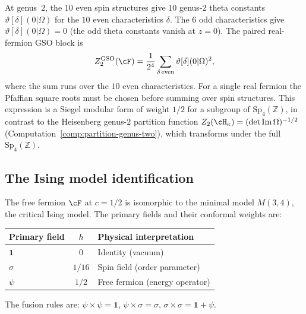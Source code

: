 \begin{remark}
\label{rem:fermion-genus2}
At genus~$2$, the $10$ even spin structures give $10$
genus-$2$ theta constants
$\vartheta[\delta](0|\Omega)$ for the $10$ even
characteristics $\delta$. The $6$ odd characteristics
give $\vartheta[\delta](0|\Omega) = 0$ (the odd theta
constants vanish at $z = 0$). The paired real-fermion GSO block is
\[
Z_2^{\mathrm{GSO}}(\cF)
= \frac{1}{2^4}\sum_{\delta\,\mathrm{even}}
 \vartheta[\delta](0|\Omega)^2,
\]
where the sum runs over the $10$ even characteristics.
For a single real fermion the Pfaffian square roots must be chosen
before summing over spin structures.
This expression is a Siegel modular form of weight $1/2$
for a subgroup of $\mathrm{Sp}_4(\mathbb{Z})$, in
contrast to the Heisenberg genus-$2$ partition function
$Z_2(\cH_\kappa) = (\det \mathrm{Im}\,\Omega)^{-1/2}$
\textup{(}Computation~\textup{\ref{comp:partition-genus-two})},
which transforms under the full $\mathrm{Sp}_4(\mathbb{Z})$.
\end{remark}

\subsection{The Ising model identification}
\label{subsec:ising-identification}

\begin{proposition}[Ising $=$ free fermion;
\ClaimStatusProvedElsewhere]
\label{prop:ising-fermion}
The free fermion $\cF$ at $c = 1/2$ is isomorphic to the
minimal model $M(3,4)$, the critical Ising model. The primary
fields and their conformal weights are:
\begin{center}
\renewcommand{\arraystretch}{1.3}
\begin{tabular}{lcl}
\toprule
\textbf{Primary field} & $h$ & \textbf{Physical interpretation} \\
\midrule
$\mathbf{1}$ & $0$ & Identity (vacuum) \\
$\sigma$ & $1/16$ & Spin field (order parameter) \\
$\psi$ & $1/2$ & Free fermion (energy operator) \\
\bottomrule
\end{tabular}
\end{center}
The fusion rules are:
$\psi \times \psi = \mathbf{1}$,\quad
$\psi \times \sigma = \sigma$,\quad
$\sigma \times \sigma = \mathbf{1} + \psi$.
\end{proposition}

